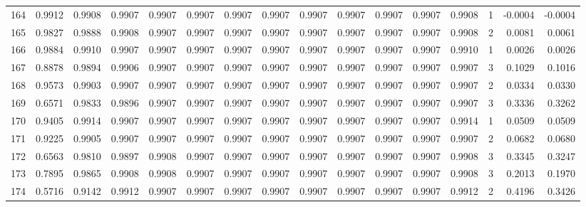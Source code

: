 \begin{tabular}{lrrrrrrrrrrrrrrr}
164 &      0.9912 &  0.9908 &  0.9907 &  0.9907 &  0.9907 &  0.9907 &  0.9907 &  0.9907 &  0.9907 &  0.9907 &   0.9907 &     0.9908 &      1 &                   -0.0004 &                    -0.0004 \\
165 &      0.9827 &  0.9888 &  0.9908 &  0.9907 &  0.9907 &  0.9907 &  0.9907 &  0.9907 &  0.9907 &  0.9907 &   0.9907 &     0.9908 &      2 &                    0.0081 &                     0.0061 \\
166 &      0.9884 &  0.9910 &  0.9907 &  0.9907 &  0.9907 &  0.9907 &  0.9907 &  0.9907 &  0.9907 &  0.9907 &   0.9907 &     0.9910 &      1 &                    0.0026 &                     0.0026 \\
167 &      0.8878 &  0.9894 &  0.9906 &  0.9907 &  0.9907 &  0.9907 &  0.9907 &  0.9907 &  0.9907 &  0.9907 &   0.9907 &     0.9907 &      3 &                    0.1029 &                     0.1016 \\
168 &      0.9573 &  0.9903 &  0.9907 &  0.9907 &  0.9907 &  0.9907 &  0.9907 &  0.9907 &  0.9907 &  0.9907 &   0.9907 &     0.9907 &      2 &                    0.0334 &                     0.0330 \\
169 &      0.6571 &  0.9833 &  0.9896 &  0.9907 &  0.9907 &  0.9907 &  0.9907 &  0.9907 &  0.9907 &  0.9907 &   0.9907 &     0.9907 &      3 &                    0.3336 &                     0.3262 \\
170 &      0.9405 &  0.9914 &  0.9907 &  0.9907 &  0.9907 &  0.9907 &  0.9907 &  0.9907 &  0.9907 &  0.9907 &   0.9907 &     0.9914 &      1 &                    0.0509 &                     0.0509 \\
171 &      0.9225 &  0.9905 &  0.9907 &  0.9907 &  0.9907 &  0.9907 &  0.9907 &  0.9907 &  0.9907 &  0.9907 &   0.9907 &     0.9907 &      2 &                    0.0682 &                     0.0680 \\
172 &      0.6563 &  0.9810 &  0.9897 &  0.9908 &  0.9907 &  0.9907 &  0.9907 &  0.9907 &  0.9907 &  0.9907 &   0.9907 &     0.9908 &      3 &                    0.3345 &                     0.3247 \\
173 &      0.7895 &  0.9865 &  0.9908 &  0.9908 &  0.9907 &  0.9907 &  0.9907 &  0.9907 &  0.9907 &  0.9907 &   0.9907 &     0.9908 &      3 &                    0.2013 &                     0.1970 \\
174 &      0.5716 &  0.9142 &  0.9912 &  0.9907 &  0.9907 &  0.9907 &  0.9907 &  0.9907 &  0.9907 &  0.9907 &   0.9907 &     0.9912 &      2 &                    0.4196 &                     0.3426 \\

\end{tabular}

